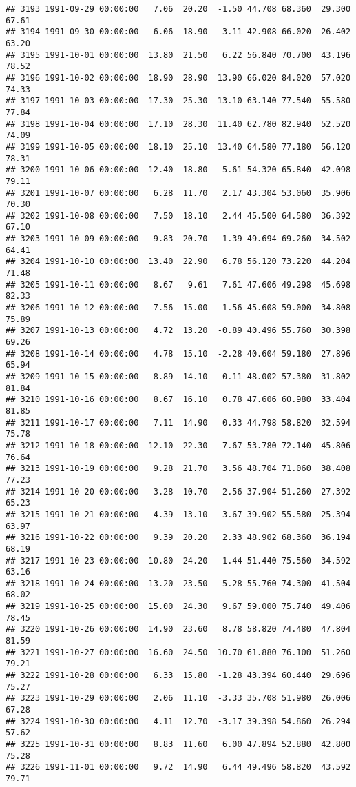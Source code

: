 \documentclass{article}\usepackage{graphicx, color}
\makeatletter
\newenvironment{kframe}{%
 \def\at@end@of@kframe{}%
 \ifinner\ifhmode%
  \def\at@end@of@kframe{\end{minipage}}%
  \begin{minipage}{\columnwidth}%
 \fi\fi%
 \def\FrameCommand##1{\hskip\@totalleftmargin \hskip-\fboxsep
 \colorbox{shadecolor}{##1}\hskip-\fboxsep
     \hskip-\linewidth \hskip-\@totalleftmargin \hskip\columnwidth}%
 \MakeFramed {\advance\hsize-\width
   \@totalleftmargin\z@ \linewidth\hsize
   \@setminipage}}%
 {\par\unskip\endMakeFramed%
 \at@end@of@kframe}
\newenvironment{knitrout}{}{} %
\makeatother
\begin{document}
\begin{knitrout}
\begin{kframe}
\begin{verbatim}
## 3193 1991-09-29 00:00:00   7.06  20.20  -1.50 44.708 68.360  29.300  67.61
## 3194 1991-09-30 00:00:00   6.06  18.90  -3.11 42.908 66.020  26.402  63.20
## 3195 1991-10-01 00:00:00  13.80  21.50   6.22 56.840 70.700  43.196  78.52
## 3196 1991-10-02 00:00:00  18.90  28.90  13.90 66.020 84.020  57.020  74.33
## 3197 1991-10-03 00:00:00  17.30  25.30  13.10 63.140 77.540  55.580  77.84
## 3198 1991-10-04 00:00:00  17.10  28.30  11.40 62.780 82.940  52.520  74.09
## 3199 1991-10-05 00:00:00  18.10  25.10  13.40 64.580 77.180  56.120  78.31
## 3200 1991-10-06 00:00:00  12.40  18.80   5.61 54.320 65.840  42.098  79.11
## 3201 1991-10-07 00:00:00   6.28  11.70   2.17 43.304 53.060  35.906  70.30
## 3202 1991-10-08 00:00:00   7.50  18.10   2.44 45.500 64.580  36.392  67.10
## 3203 1991-10-09 00:00:00   9.83  20.70   1.39 49.694 69.260  34.502  64.41
## 3204 1991-10-10 00:00:00  13.40  22.90   6.78 56.120 73.220  44.204  71.48
## 3205 1991-10-11 00:00:00   8.67   9.61   7.61 47.606 49.298  45.698  82.33
## 3206 1991-10-12 00:00:00   7.56  15.00   1.56 45.608 59.000  34.808  75.89
## 3207 1991-10-13 00:00:00   4.72  13.20  -0.89 40.496 55.760  30.398  69.26
## 3208 1991-10-14 00:00:00   4.78  15.10  -2.28 40.604 59.180  27.896  65.94
## 3209 1991-10-15 00:00:00   8.89  14.10  -0.11 48.002 57.380  31.802  81.84
## 3210 1991-10-16 00:00:00   8.67  16.10   0.78 47.606 60.980  33.404  81.85
## 3211 1991-10-17 00:00:00   7.11  14.90   0.33 44.798 58.820  32.594  75.78
## 3212 1991-10-18 00:00:00  12.10  22.30   7.67 53.780 72.140  45.806  76.64
## 3213 1991-10-19 00:00:00   9.28  21.70   3.56 48.704 71.060  38.408  77.23
## 3214 1991-10-20 00:00:00   3.28  10.70  -2.56 37.904 51.260  27.392  65.23
## 3215 1991-10-21 00:00:00   4.39  13.10  -3.67 39.902 55.580  25.394  63.97
## 3216 1991-10-22 00:00:00   9.39  20.20   2.33 48.902 68.360  36.194  68.19
## 3217 1991-10-23 00:00:00  10.80  24.20   1.44 51.440 75.560  34.592  63.16
## 3218 1991-10-24 00:00:00  13.20  23.50   5.28 55.760 74.300  41.504  68.02
## 3219 1991-10-25 00:00:00  15.00  24.30   9.67 59.000 75.740  49.406  78.45
## 3220 1991-10-26 00:00:00  14.90  23.60   8.78 58.820 74.480  47.804  81.59
## 3221 1991-10-27 00:00:00  16.60  24.50  10.70 61.880 76.100  51.260  79.21
## 3222 1991-10-28 00:00:00   6.33  15.80  -1.28 43.394 60.440  29.696  75.27
## 3223 1991-10-29 00:00:00   2.06  11.10  -3.33 35.708 51.980  26.006  67.28
## 3224 1991-10-30 00:00:00   4.11  12.70  -3.17 39.398 54.860  26.294  57.62
## 3225 1991-10-31 00:00:00   8.83  11.60   6.00 47.894 52.880  42.800  75.28
## 3226 1991-11-01 00:00:00   9.72  14.90   6.44 49.496 58.820  43.592  79.71

\end{verbatim}
\end{kframe}
\end{knitrout}
\end{document}
